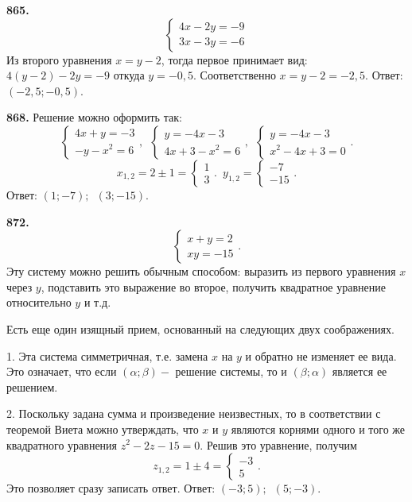 \textbf{865.}  $$\begin{cases} 4x-2y=-9 \\ 3x-3y=-6 \end{cases}$$ Из второго уравнения $x=y-2$, тогда первое принимает вид: $4(y-2)-2y=-9$ откуда $y=-0,5$. Соответственно $x=y-2=-2,5.$ \newline \null \hspace*{\fill} Ответ: $(-2,5;-0,5)$.             

\newpage \textbf{868.} Решение можно оформить так:
$$\begin{cases} 4x+y=-3 \\ -y-x^2=6 \end{cases},\enspace\begin{cases} y=-4x-3 \\ 4x+3-x^2=6 \end{cases},\enspace \begin{cases} y=-4x-3 \\ x^2-4x+3=0 \end{cases}.$$ $$x_{1,2}=2\pm1=\begin{cases}1 \\ 3 \end{cases}.\enspace y_{1,2}=\begin{cases}-7 \\ -15 \end{cases}.$$ \newline \null \hspace*{\fill} Ответ: $(1;-7);\enspace(3;-15)$.

\textbf{872.}  $$\begin{cases}x+y=2\\ xy=-15 \end{cases}.$$ Эту систему можно решить обычным способом: выразить  из первого уравнения $x$ через $y$, подставить это выражение во второе, получить квадратное уравнение относительно $y$ и т.д. 

Есть еще один изящный прием, основанный на следующих двух соображениях.  

1. Эта система симметричная, т.е. замена $x$ на $y$ и обратно не изменяет ее вида. Это означает, что если $(\alpha;\beta)-$ решение системы, то и $(\beta;\alpha)$ является ее решением. 

2. Поскольку задана сумма и произведение неизвестных, то в соответствии с теоремой Виета можно утверждать, что $x$ и $y$ являются корнями одного и того же квадратного уравнения  \newline$z^2-2z-15=0$. Решив это уравнение, получим  $$z_{1,2}=1\pm4=\begin{cases}-3\\ 5 \end{cases}.$$ Это позволяет сразу записать ответ. \newline \null \hspace*{\fill} Ответ: $(-3;5);\enspace(5;-3)$.  

